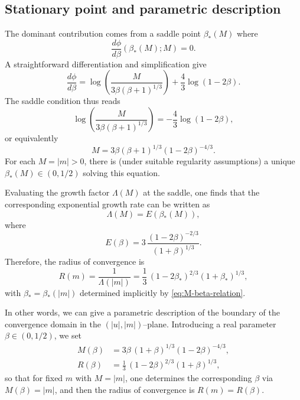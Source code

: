 \documentclass[11pt, a4paper]{article}
\numberwithin{equation}{section}
\begin{document}
\subsection{Stationary point and parametric description}
The dominant contribution comes from a saddle point $\beta_*(M)$ where
\begin{equation}
  \frac{d\phi}{d\beta}(\beta_*(M);M) = 0.
\end{equation}
A straightforward differentiation and simplification give
\begin{equation}
  \frac{d\phi}{d\beta}
  =
  \log\!\left(\frac{M}{3\beta(\beta+1)^{1/3}}\right)
  + \frac{4}{3}\log(1-2\beta).
\end{equation}
The saddle condition thus reads
\begin{equation}
  \log\!\left(\frac{M}{3\beta(\beta+1)^{1/3}}\right)
  = -\frac{4}{3}\log(1-2\beta),
\end{equation}
or equivalently
\begin{equation}
  M
  = 3\beta(\beta+1)^{1/3}(1-2\beta)^{-4/3}.
  \label{eq:M-beta-relation}
\end{equation}
For each $M = |m|>0$, there is (under suitable regularity assumptions) a unique
$\beta_*(M)\in(0,1/2)$ solving this equation.

Evaluating the growth factor $\Lambda(M)$ at the saddle, one finds that the
corresponding exponential growth rate can be written as
\begin{equation}
  \Lambda(M) = E(\beta_*(M)),
\end{equation}
where
\begin{equation}
  E(\beta) = 3\,\frac{(1-2\beta)^{-2/3}}{(1+\beta)^{1/3}}.
\end{equation}
Therefore, the radius of convergence is
\begin{equation}
  R(m)
  = \frac{1}{\Lambda(|m|)}
  = \frac{1}{3}\,(1-2\beta_*)^{2/3}(1+\beta_*)^{1/3},
\end{equation}
with $\beta_* = \beta_*(|m|)$ determined implicitly by
\eqref{eq:M-beta-relation}.

In other words, we can give a parametric description of the boundary of the
convergence domain in the $(|u|,|m|)$--plane. Introducing a real parameter
$\beta \in (0,1/2)$, we set
\begin{equation}
  \boxed{
  \begin{aligned}
    M(\beta) &= 3\beta\,(1+\beta)^{1/3}(1-2\beta)^{-4/3},\\[3pt]
    R(\beta) &= \frac{1}{3}\,(1-2\beta)^{2/3}(1+\beta)^{1/3},
  \end{aligned}
  }
\end{equation}
so that for fixed $m$ with $M=|m|$, one determines the corresponding $\beta$ via
$M(\beta)=|m|$, and then the radius of convergence is $R(m)=R(\beta)$.
\end{document}
